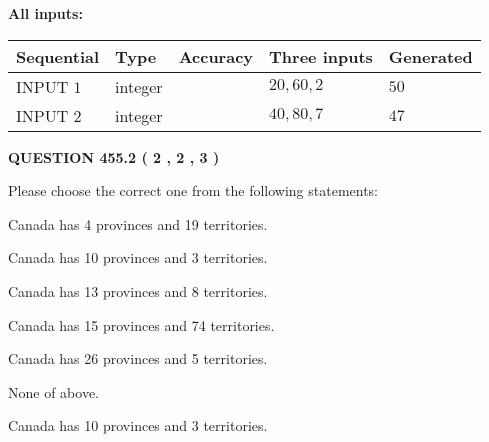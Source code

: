 \documentclass[12pt]{article}
\begin{document}
   
   
   
\noindent{}
   
   
   
   
\noindent\vspace{0.1in}\hspace{-0.08in} {\textbf{\Large{All inputs: }}}
   
   
  
  
\noindent\begin{tabular}{|l|l|l|l|l|}
\hline
 Sequential & Type & Accuracy & Three inputs & Generated \\ 
\hline
 
 
  INPUT $  1 $ & integer &  & $
 20
 , 
 60
 , 
 2
 $ & $ 50 $ 
 \\  \hline  
 
 
  INPUT $  2 $ & integer &  & $
 40
 , 
 80
 , 
 7
 $ & $ 47 $ 
 \\  \hline  
 \end{tabular}
   
   
  
\vspace{0.2in}
  
{\textbf{\Large{QUESTION
455.2 
 ( 2 , 2 , 3 )
}}}
  
  
Please choose the correct one from the following statements:
 
 
Canada has   4 provinces and  19 territories.
 
 
Canada has 10  provinces and 3 territories.
 
 
Canada has  13 provinces and  8 territories.
 
 
Canada has  15 provinces and  74 territories.
 
 
Canada has  26 provinces and  5 territories.
 
 
 None of above.
 
 
\noindent{}
 
 
Canada has 10  provinces and 3 territories.
 
 
\noindent{}
 
 
   
\end{document}
